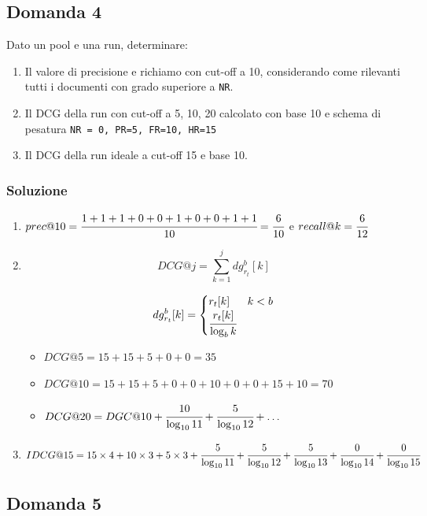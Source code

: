 \subsection{Domanda 4}

Dato un pool e una run, determinare:

\begin{enumerate}
	\item Il valore di precisione e richiamo con cut-off a 10, considerando come rilevanti tutti i documenti con grado superiore a \texttt{NR}.
	\item Il DCG della run con cut-off a 5, 10, 20 calcolato con base 10 e schema di pesatura \texttt{NR = 0, PR=5, FR=10, HR=15}
	\item Il DCG della run ideale a cut-off 15 e base 10.
\end{enumerate}

\subsubsection{Soluzione}

\begin{enumerate}
	\item $prec@10 = \cfrac{1 + 1 + 1 + 0 + 0 + 1 + 0 + 0 + 1 + 1}{10} = \cfrac{6}{10}$ e $recall@k = \cfrac{6}{12}$
	
	\item
	$$
	DCG@j = \sum\limits_{k = 1}^{j} dg_{r_t}^b[k]
	$$
	
	$$
	dg_{r_t}^b[k] = \begin{cases}
	r_t[k] & k < b \\
	\cfrac{r_t[k]}{\log_b k}
	\end{cases}
	$$
	\begin{itemize}
		\item $DCG@5 = 15 + 15 + 5 + 0 + 0 = 35$
		\item $DCG@10 = 15 + 15 + 5 + 0 + 0 + 10 + 0+ 0 + 15 + 10 = 70$
		\item $DCG@20 = DGC@10 + \cfrac{10}{\log_{10}11} + \cfrac{5}{\log_{10}12} + \ldots $
	\end{itemize}

	\item $IDCG@15 = 15 \times 4 + 10 \times 3 + 5 \times 3 + \cfrac{5}{\log_{10}11} + \cfrac{5}{\log_{10}12} + \cfrac{5}{\log_{10}13} +\cfrac{0}{\log_{10}14} +\cfrac{0}{\log_{10}15} $
\end{enumerate}

\subsection{Domanda 5}

